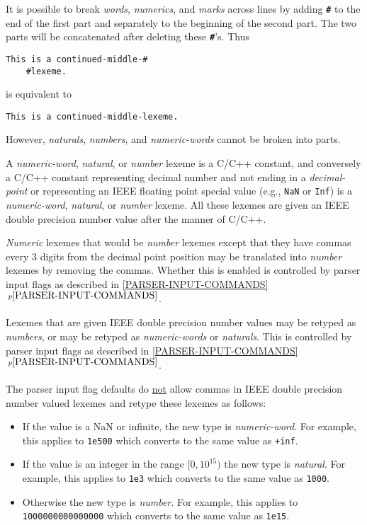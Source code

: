 \documentclass[12pt]{article}
\newcommand{\TT}[1]{{\tt \bfseries #1}}
\newcommand{\itemref}[1]{\ref{#1}$\,^{p\pageref{#1}}$}
\newenvironment{indpar}[1][0.3in]%
	{\begin{list}{}%
		     {\setlength{\itemsep}{0in}%
		      \setlength{\topsep}{0in}%
		      \setlength{\parsep}{1ex}%
		      \setlength{\labelwidth}{#1}%
		      \setlength{\leftmargin}{#1}%
		      \addtolength{\leftmargin}{\labelsep}}%
	 \item}%
	{\end{list}}
\begin{document}
It is possible to break {\em words}, {\em numerics}, and {\em marks}
across lines by
adding \TT{\#} to the end of the first part and separately
to the beginning of the second part.  The two parts will be
concatenated after deleting these \TT{\#}'s.  Thus
\begin{indpar}\begin{verbatim}
This is a continued-middle-#
    #lexeme.
\end{verbatim}\end{indpar}
is equivalent to
\begin{indpar}\begin{verbatim}
This is a continued-middle-lexeme.
\end{verbatim}\end{indpar}
However, {\em naturals}, {\em numbers}, and {\em numeric-words}
cannot be broken into parts.

A {\em numeric-word}, {\em natural}, or {\em number} lexeme
is a C/C++ constant, and 
conversely a C/C++ constant representing decimal number
and not ending in a {\em decimal-point} or representing an
IEEE floating point special value (e.g., {\tt NaN} or {\tt Inf})
is a {\em numeric-word}, {\em natural}, or {\em number} lexeme.
All these lexemes are given an IEEE double precision number value
after the manner of C/C++.

{\em Numeric} lexemes
that would be {\em number} lexemes except that they have commas
every 3 digits from the decimal point position may be translated into
{\em number} lexemes by removing the commas.  Whether this is
enabled is controlled by parser input flags as described in
\itemref{PARSER-INPUT-COMMANDS}.

Lexemes that are given IEEE double precision number values may
be retyped as {\em numbers}, or may be retyped as {\em numeric-words}
or {\em naturals}.  This is controlled by parser input flags
as described in \itemref{PARSER-INPUT-COMMANDS}.

The parser input flag defaults do \underline{not} allow commas
in IEEE double precision number valued lexemes and retype these
lexemes as follows:
\begin{itemize}
\item If the value is a NaN or infinite, the
new type is {\em numeric-word}.  For example, this applies to {\tt 1e500}
which converts to the same value as {\tt +inf}.
\item If the value is an integer in the range $[0,10^{15})$ the new
type is {\em natural}.
For example, this applies to {\tt 1e3}
which converts to the same value as {\tt 1000}.
\item Otherwise the new type is {\em number}.
For example, this applies to {\tt 1000000000000000}
which converts to the same value as {\tt 1e15}.
\end{itemize}
\end{document}
